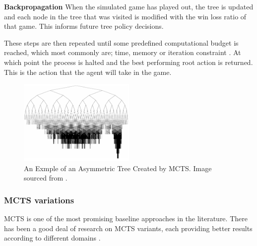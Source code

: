 \documentclass[journal]{IEEEtran}
\begin{document}
		\textbf{Backpropagation}
			When the simulated game has played out, the tree is updated and each node in the tree that was visited is modified with the win loss ratio of that game. This informs future tree policy decisions.
			
			These steps are then repeated until some predefined computational budget is reached, which most commonly are; time, memory or iteration constraint \cite{browne2012survey}. At which point the process is halted and the best performing root action is returned. This is the action that the agent will take in the game.


		
		\begin{figure}[h]
		    \centering
		    \includegraphics[width=0.5\textwidth]{MCTSasymmetry}
		    \caption{An Exmple of an Asymmetric Tree Created by MCTS. Image sourced from \cite{coquelin2007bandit}. }
		    \label{fig:MCTS2}
		\end{figure}




		\subsubsection{MCTS variations} \label{sssec:MCTSvariations}
			MCTS is one of the most promising baseline approaches in the  literature.
			There has been a good deal of research on MCTS variants, each providing better results according to different domains \cite{browne2012survey, park2015mcts, perez2014knowledge, ilhan2017monte, de2016monte, frydenberg2015investigating}.
\end{document}
